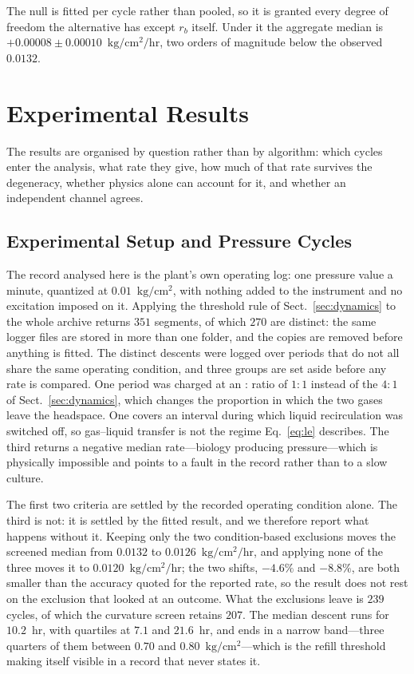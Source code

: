 \documentclass[sigconf]{acmart}
\newcommand{\pu}{\ensuremath{\mathrm{kg/cm^{2}}}}
\newcommand{\ratu}{\ensuremath{\mathrm{kg/cm^{2}/hr}}}
\newcommand{\rb}{\ensuremath{r_{b}}}
\begin{document}
The null is fitted per cycle rather than pooled, so it is granted every
degree of freedom the alternative has except $\rb$ itself. Under it the
aggregate median is
$+0.00008 \pm 0.00010$~\ratu{}, two orders of magnitude below the
observed $0.0132$.

\section{Experimental Results}
\label{sec:results}

The results are organised by question rather than by algorithm: which
cycles enter the analysis, what rate they give, how much of that rate
survives the degeneracy, whether physics alone can account for it, and
whether an independent channel agrees.

\subsection{Experimental Setup and Pressure Cycles}
\label{sec:setup}

The record analysed here is the plant's own operating log: one pressure
value a minute, quantized at $0.01$~\pu{}, with nothing added to the
instrument and no excitation imposed on it. Applying the threshold rule
of Sect.~\ref{sec:dynamics} to the whole archive returns $351$ segments, of which $270$ are
distinct: the same logger files are stored in more than one folder,
and the copies are removed before anything is fitted. The distinct
descents were logged over periods that do not all share the same operating
condition, and three groups are set aside before any rate is compared.
One period was charged at an : ratio of $1{:}1$ instead
of the $4{:}1$ of Sect.~\ref{sec:dynamics}, which changes the
proportion in which the two gases leave the headspace. One covers an
interval during which liquid recirculation was switched off, so
gas--liquid transfer is not the regime Eq.~\eqref{eq:le} describes.
The third returns a negative median rate---biology producing
pressure---which is physically impossible and points to a fault in the
record rather than to a slow culture.

The first two criteria are settled by the recorded operating condition
alone. The third is not: it is settled by the fitted result, and we
therefore report what happens without it. Keeping only the two
condition-based exclusions moves the screened median from $0.0132$ to
$0.0126$~\ratu{}, and applying none of the three moves it to
$0.0120$~\ratu{}; the two shifts, $-4.6\%$ and $-8.8\%$, are both
smaller than the accuracy quoted for the reported rate, so the result
does not rest on the exclusion that looked at an outcome. What the
exclusions leave is $239$ cycles, of which the curvature screen retains
$207$. The median descent runs for $10.2$~hr, with quartiles at $7.1$
and $21.6$~hr, and ends in a narrow band---three quarters of them
between $0.70$ and $0.80$~\pu{}---which is the refill threshold making
itself visible in a record that never states it.
\end{document}
